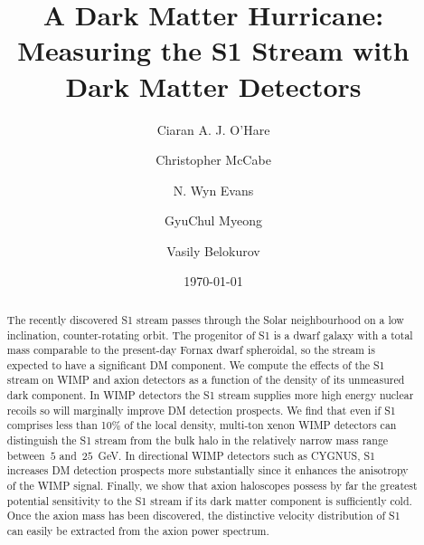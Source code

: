 \documentclass[prd,10pt,twocolumn,showpacs,nofootinbib,aps,superscriptaddress,preprintnumbers]{revtex4-1}
\begin{document}
\title{A Dark Matter Hurricane: Measuring the S1 Stream with Dark
  Matter Detectors}

\author{Ciaran A. J. O'Hare} 

\author{Christopher McCabe} 

\author{N. Wyn Evans} 

\author{GyuChul Myeong}

\author{Vasily Belokurov}


\date{\today}
\smallskip
\begin{abstract}
The recently discovered S1 stream passes through the Solar
neighbourhood on a low inclination, counter-rotating orbit. The
progenitor of S1 is a dwarf galaxy with a total mass
comparable to the present-day
Fornax dwarf spheroidal, 
so the stream is expected to have a significant DM component.
We compute the effects of the S1 stream on
WIMP and axion detectors as a function
of the density of its unmeasured dark component. 
In WIMP detectors the S1 stream supplies more high energy nuclear 
recoils so will marginally improve DM detection prospects.
We find that even if S1 comprises less than 10\% of the local density, multi-ton xenon WIMP detectors can distinguish the S1 stream from the bulk halo
in the relatively narrow mass range between~$5$ and~$25$~GeV.
In directional WIMP detectors such as CYGNUS, S1 increases DM detection prospects more substantially 
since it enhances the anisotropy of the WIMP signal.
Finally, we show that axion haloscopes possess by far the greatest potential sensitivity to the S1 stream if its dark matter component is sufficiently cold. 
Once the axion mass has been discovered, the distinctive velocity distribution of S1 can easily be extracted from the axion power spectrum.
\end{abstract}

\maketitle
\end{document}
